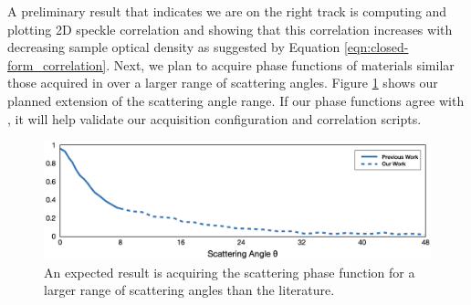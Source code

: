 A preliminary result that indicates we are on the right track is computing and plotting 2D speckle correlation and showing that this correlation increases with decreasing sample optical density as suggested by Equation \ref{eqn:closed-form_correlation}. Next, we plan to acquire phase functions of materials similar those acquired in \cite{alterman2022direct} over a larger range of scattering angles. Figure \ref{fig:extended_phase_function} shows our planned extension of the scattering angle range. If our phase functions agree with \cite{alterman2022direct}, it will help validate our acquisition configuration and correlation scripts.
%
\begin{figure}
    \centering
    \includegraphics[width=\textwidth]{figures/extended_phase_function.png}
    \caption{An expected result is acquiring the scattering phase function for a larger range of scattering angles than the literature.}
    \label{fig:extended_phase_function}
\end{figure}